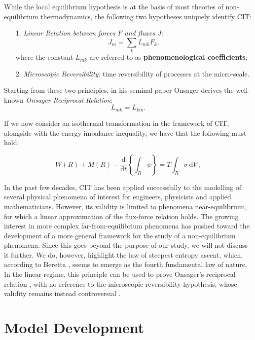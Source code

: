 \documentclass[runningheads]{llncs}
\renewcommand{\d}{\ensuremath{\text{d}}}
\begin{document}
While the local equilibrium hypothesis is at the basis of most theories of non-equilibrium thermodynamics, the following two hypotheses uniquely identify CIT:
\begin{itemize}
	\item[1.] \textit{Linear Relation between forces $F$ and fluxes $J$}:
	\begin{equation}
	J_m = \sum_k L_{mk} F_k,\label{lin}
	\end{equation}
	where the constant $L_{mk}$ are referred to as \textbf{phenomenological coefficients};
	\item[2.] \textit{Microscopic Reversibility}: time reversibility of processes at the micro-scale. 
\end{itemize}

Starting from these two principles, in his seminal paper \cite{onsager} Onsager derives the well-known \textit{Onsager Reciprocal Relation}:
\begin{equation}
L_{mk}=L_{km}.
\end{equation}

If we now consider an isothermal transformation in the framework of CIT, alongside with the energy imbalance inequality, we have that the following must hold:

\begin{equation}
W(R)+M(R)-\frac{\d}{\d t} \left\{\int_R \psi \right\} = T \int_R \sigma \,\d V\, ,
\label{eqCIT}
\end{equation}

In the past few decades, CIT has been applied successfully to the modelling of several physical phenomena of interest for engineers, physicists and applied mathematicians. However, its validity is limited to phenomena near-equilibrium, for which a linear approximation of the flux-force relation holds. The growing interest in more complex far-from-equilibrium phenomena has pushed toward the development of a more general framework for the study of a non-equilibrium phenomena. Since this goes beyond the purpose of our study, we will not discuss it further. We do, however, highlight the law of steepest entropy ascent, which, according to Beretta \cite{SEA2}, seems to emerge as the fourth fundamental law of nature. In the linear regime, this principle can be used to prove Onsager's reciprocal relation \cite{SEA1}, with no reference to the microscopic reversibility hypothesis, whose validity remains instead controversial \cite{CIT}.

\section{Model Development}
\label{modeldev}
\end{document}
